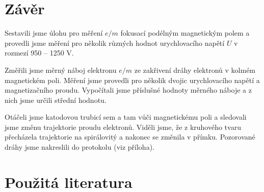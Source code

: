 \documentclass[english]{article}
\begin{document}
\section{Závěr}
	Sestavili jsme úlohu pro měření $e/m$ fokusací podélným magnetickým polem a provedli jsme měření pro několik různých hodnot urychlovacího napětí $U$ v rozmezí 950 -- 1250 V. 
	
	Změřili jsme měrný náboj elektronu $e/m$ ze zakřivení dráhy elektronů v kolmém magnetickém poli. Měření jsme provedli pro několik dvojic urychlovacího napětí a magnetizačního proudu. Vypočítali jsme příslušné hodnoty měrného náboje a z nich jsme určili střední hodnotu. 
	
	Otáčeli jsme katodovou trubicí sem a tam vůči magnetickému poli a sledovali jsme změnu trajektorie proudu elektronů. Viděli jsme, že z kruhového tvaru přecházela trajektorie na spirálovitý a nakonec se změnila v přímku. Pozorované dráhy jsme nakreslili do protokolu (viz příloha). 
	
\section {Použitá literatura}
\begingroup
\renewcommand{\section}[2]{}
\end{document}
